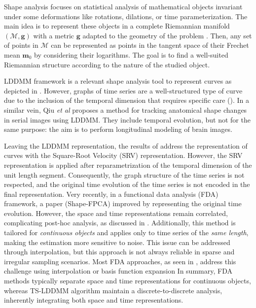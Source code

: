 Shape analysis focuses on statistical analysis of mathematical objects invariant under some deformations like rotations, dilations, or time parameterization.
 The main idea is to represent these objects in a complete Riemannian manifold $(\mathcal{M},\mathbf{g})$ with a metric $\mathbf{g}$ adapted to the geometry of the problem \cite{miller2006geodesic}.
 Then, any set of points in $\mathcal{M}$ can be represented as points in the tangent space of their Frechet mean $\mathbf{m}_0$ \cite{pal2017riemannian,le2001locating} by considering their logarithms.
 The goal is to find a well-suited Riemannian structure according to the nature of the studied object.
 
 LDDMM framework is a relevant shape analysis tool to represent curves as depicted in \cite{glaunes2008large}. However, graphs of time series are a well-structured type of curve due to the inclusion of the temporal dimension that requires specific care ().
 In a similar vein, Qiu \textit{et al} \cite{qiu2009time} proposes a method for tracking anatomical shape changes in serial images using LDDMM. They include temporal evolution, but not for the same purpose: the aim is to perform longitudinal modeling of brain images.

 Leaving the LDDMM representation, the results of \cite{srivastava2010shape,heo2024logistic} address the representation of curves with the Square-Root Velocity (SRV) representation.
 However, the SRV representation is applied after reparametrization of the temporal dimension of the unit length segment.
 Consequently, the graph structure of the time series is not respected, and the original time evolution of the time series is not encoded in the final representation.
 Very recently, in a functional data analysis (FDA) framework, a paper \cite{wu2024shape} (Shape-FPCA) improved by representing the original time evolution.
 However, the space and time representations remain correlated, complicating post-hoc analysis, as discussed in  .
 Additionally, this method is tailored for \textit{continuous objects} and applies only to time series of the \textit{same length}, making the estimation more sensitive to noise. 
 This issue can be addressed through interpolation, but this approach is not always reliable in sparse and irregular sampling scenarios.
 Most FDA approaches, as seen in \cite{shang2014survey,yu2017principal,warmenhoven2021pca}, address this challenge using interpolation or basis function expansion
 In summary, FDA methods typically separate space and time representations for continuous objects, whereas TS-LDDMM algorithm maintain a discrete-to-discrete analysis, inherently integrating both space and time representations.

